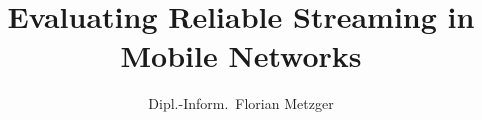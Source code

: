 
\title{Evaluating Reliable Streaming in Mobile Networks}
\newcommand{\name}{Florian Metzger}
\author{Dipl.-Inform.~\name}
\newcommand{\betreuer}{Univ.-Prof.~Dipl.-Ing.~Dr.~Helmut Hlavacs}
\newcommand{\gutachterA}{Univ.-Prof.~Dipl.-Math.~Dr.~Peter Reichl,~M.A.~St.}
\newcommand{\gutachterB}{Prof.~Dr.-Ing.~Phuoc Tran-Gia}

\newcommand{\dissertationsgebiet}{Informatik}
\newcommand{\studienkennzahl}{A 786 880}
\newcommand{\akademischergrad}{Doktor der technischen Wissenschaften (Dr.~tech.)}
